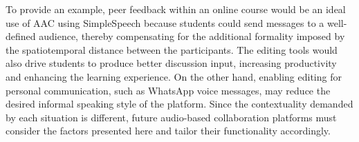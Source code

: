To provide an example, peer feedback within an online course would be an ideal use of AAC using SimpleSpeech because students could send messages to a well-defined audience, thereby compensating for the additional formality imposed by the spatiotemporal distance between the participants. 
The editing tools would also drive students to produce better discussion input, increasing productivity and enhancing the learning experience.
On the other hand, enabling editing for personal communication, such as WhatsApp voice messages, may reduce the desired informal speaking style of the platform.
Since the contextuality demanded by each situation is different, future audio-based collaboration platforms must consider the factors presented here and tailor their functionality accordingly.
